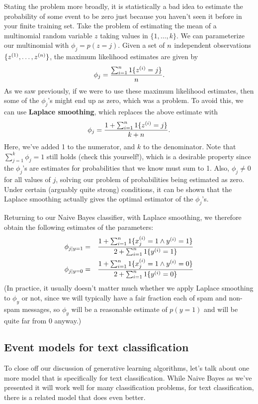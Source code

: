 \documentclass{article}
\begin{document}
Stating the problem more broadly, it is statistically a bad idea to estimate the probability of some event to be zero
just because you haven't seen it before in your finite training set. Take the problem of estimating
the mean of a multinomial random variable $z$ taking values in $\{1, \ldots, k\}$.  We can parameterize
our multinomial with $\phi_j = p(z=j)$.  Given a set of ${n}$ independent observations $\{z^{(1)}, \ldots, z^{({n})}\}$, the
maximum likelihood estimates are given by
\[
\phi_j = \frac{\sum_{i=1}^{n} 1\{z^{(i)}=j\}}{{n}}.
\]
As we saw previously, if we were to use these maximum likelihood estimates, then some of the $\phi_j$'s might
end up as zero, which was a problem.
To avoid this, we can use {\bf Laplace smoothing}, which replaces the above estimate with
\[
\phi_j = \frac{1 + \sum_{i=1}^{n} 1\{z^{(i)} = j\}}{k + {n}}.
\]
Here, we've added 1 to the numerator, and $k$ to the denominator.
Note that $\sum_{j=1}^k \phi_j = 1$ still holds (check this yourself!), which is a desirable property since
the $\phi_j$'s are estimates for probabilities that we know must sum to 1.  Also, $\phi_j \neq 0$ for all values
of $j$, solving our problem of probabilities being estimated as zero.  Under certain (arguably quite strong) conditions, it can be shown that the Laplace
smoothing actually gives the optimal estimator of the $\phi_j$'s.

Returning to our Naive Bayes classifier, with Laplace smoothing, we therefore obtain the
following estimates of the parameters:
\begin{eqnarray*}
\phi_{j|y=1} &=& \frac{1 + \sum_{i=1}^{n} 1\{x^{(i)}_j =1 \wedge {y^{(i)}}=1\}}{2 + \sum_{i=1}^{n} 1\{{y^{(i)}}=1\}} \\
\phi_{j|y=0} &=& \frac{1 + \sum_{i=1}^{n} 1\{x^{(i)}_j =1 \wedge {y^{(i)}}=0\}}{2 + \sum_{i=1}^{n} 1\{{y^{(i)}}=0\}} \\
\end{eqnarray*}
(In practice, it usually doesn't matter much whether we apply Laplace smoothing to $\phi_y$ or not,
since we will typically have a fair fraction each of spam and non-spam messages, so
$\phi_y$ will be a reasonable estimate of $p(y=1)$ and will be quite far from 0 anyway.)


\subsection{Event models for text classification}

To close off our discussion of generative learning algorithms, let's talk about one more
model that is specifically for text classification.  While Naive Bayes as we've presented
it will work well for many classification problems, for text classification, there is
a related model that does even better.
\end{document}
